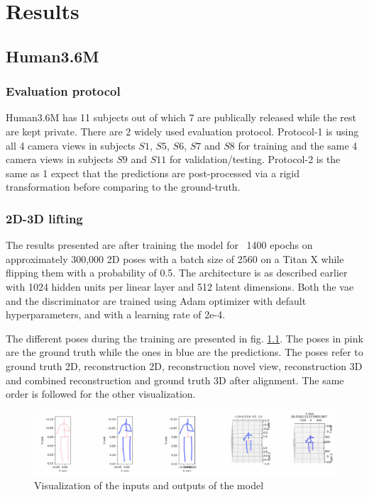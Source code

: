 \chapter{Results} %

\section{Human3.6M}
\subsection{Evaluation protocol}
Human3.6M has 11 subjects out of which 7 are publically released while the rest are kept private. There are 2 widely used evaluation protocol. Protocol-1 is using all 4 camera views in subjects $S1$, $S5$, $S6$, $S7$ and $S8$ for training and the 
same 4 camera views in subjects $S9$ and $S11$ for validation/testing. Protocol-2 is the same as 1 expect that the predictions are post-processed via a rigid transformation
before comparing to the ground-truth.


\subsection{2D-3D lifting}

The results presented are after training the model for ~1400 epochs on approximately 300,000 2D poses with a batch size of 2560 on a Titan X while flipping them with a probability of 0.5. The architecture is as described earlier with 1024 hidden units per linear layer and 512 latent dimensions. Both the \ac{vae} and the discriminator are trained using Adam optimizer with default hyperparameters, and with a learning rate of 2e-4. 

The different poses during the training are presented in fig. \ref{fig:sample_pred}. The poses in pink are the ground truth while the ones in blue are the predictions. The poses refer to ground truth 2D, reconstruction 2D, reconstruction novel view, reconstruction 3D and combined reconstruction and ground truth 3D after alignment. The same order is followed for the other visualization. 

\begin{figure}[!h]
    \centering
    \includegraphics[scale=0.4]{figures/sample_pred.png}
    \caption{Visualization of the inputs and outputs of the model}
    \label{fig:sample_pred}
\end{figure}

